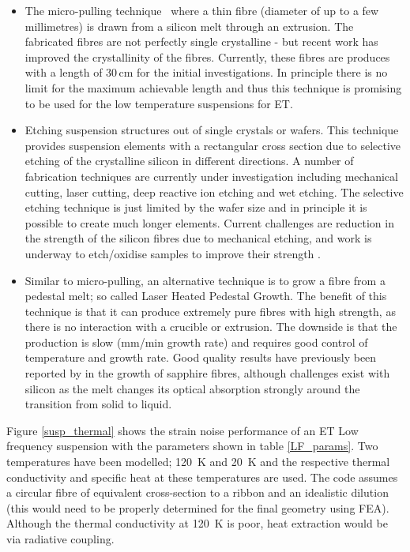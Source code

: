 \begin{itemize}
\item The micro-pulling technique~\cite{articolofibresil} where a thin fibre (diameter of up to a few millimetres) is drawn from a silicon melt through an extrusion. The fabricated fibres are not perfectly single crystalline - but recent work has improved the crystallinity of the fibres. Currently, these fibres are produces with a length of 30\,cm for the initial investigations. In principle there is no limit for the maximum achievable length and thus this technique is promising to be used for the low temperature suspensions for ET.

\item Etching suspension structures out of single crystals or wafers. This technique provides suspension elements with a rectangular cross section due to selective etching of the crystalline silicon in different directions. A number of fabrication techniques are currently under investigation including mechanical cutting, laser cutting, deep reactive ion etching and wet etching. The selective etching technique is just limited by the wafer size and in principle it is possible to create much longer elements. Current challenges are reduction in the strength of the silicon fibres due to mechanical etching, and work is underway to etch/oxidise samples to improve their strength \cite{Cumming:2014}.

\item Similar to micro-pulling, an alternative technique is to grow a fibre from a pedestal melt; so called Laser Heated Pedestal Growth. The benefit of this technique is that it can produce extremely pure fibres with high strength, as there is no interaction with a crucible or extrusion. The downside is that the production is slow (mm/min growth rate) and requires good control of temperature and growth rate. Good quality results have previously been reported by \cite{Fejer:1984} in the growth of sapphire fibres, although challenges exist with silicon as the melt changes its optical absorption strongly around the transition from solid to liquid.
\end{itemize}

Figure \ref{susp_thermal} shows the strain noise performance of an ET Low frequency suspension with the parameters shown in table \ref{LF_params}. Two temperatures have been modelled; 120~K and 20~K and the respective thermal conductivity and specific heat at these temperatures are used. The code assumes a circular fibre of equivalent cross-section to a ribbon and an idealistic dilution (this would need to be properly determined for the final geometry using FEA). Although the thermal conductivity at 120~K is poor, heat extraction would be via radiative coupling.



